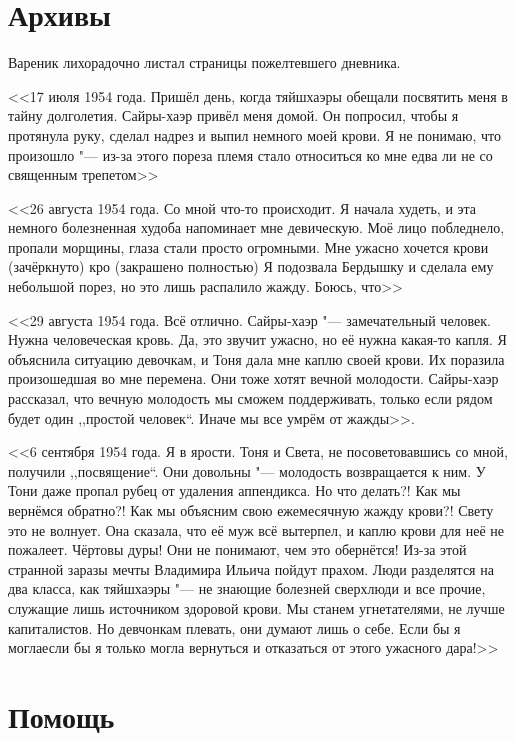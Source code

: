 \section{Архивы}

Вареник лихорадочно листал страницы пожелтевшего дневника.

<<17 июля 1954 года.
Пришёл день, когда тяйшхаэры обещали посвятить меня в тайну долголетия.
Сайры-хаэр привёл меня домой.
Он попросил, чтобы я протянула руку, сделал надрез и выпил немного моей крови.
Я не понимаю, что произошло "--- из-за этого пореза племя стало относиться ко мне едва ли не со священным трепетом\ldotst>>

<<26 августа 1954 года.
Со мной что-то происходит.
Я начала худеть, и эта немного болезненная худоба напоминает мне девическую.
Моё лицо побледнело, пропали морщины, глаза стали просто огромными.
Мне ужасно хочется крови (зачёркнуто) кро (закрашено полностью)
Я подозвала Бердышку и сделала ему небольшой порез, но это лишь распалило жажду.
Боюсь, что\ldotst>>

<<29 августа 1954 года.
Всё отлично.
Сайры-хаэр "--- замечательный человек. 
Нужна человеческая кровь.
Да, это звучит ужасно, но её нужна какая-то капля.
Я объяснила ситуацию девочкам, и Тоня дала мне каплю своей крови.
Их поразила произошедшая во мне перемена.
Они тоже хотят вечной молодости.
Сайры-хаэр рассказал, что вечную молодость мы сможем поддерживать, только если рядом будет один ,,простой человек``.
Иначе мы все умрём от жажды>>.

<<6 сентября 1954 года.
Я в ярости.
Тоня и Света, не посоветовавшись со мной, получили ,,посвящение``.
Они довольны "--- молодость возвращается к ним.
У Тони даже пропал рубец от удаления аппендикса.
Но что делать?!
Как мы вернёмся обратно?!
Как мы объясним свою ежемесячную жажду крови?!
Свету это не волнует.
Она сказала, что её муж всё вытерпел, и каплю крови для неё не пожалеет.
Чёртовы дуры!
Они не понимают, чем это обернётся!
Из-за этой странной заразы мечты Владимира Ильича пойдут прахом.
Люди разделятся на два класса, как тяйшхаэры "--- не знающие болезней сверхлюди и все прочие, служащие лишь источником здоровой крови.
Мы станем угнетателями, не лучше капиталистов.
Но девчонкам плевать, они думают лишь о себе.
Если бы я могла\ldotst если бы я только могла вернуться и отказаться от этого ужасного дара!>>

\section{Помощь}

